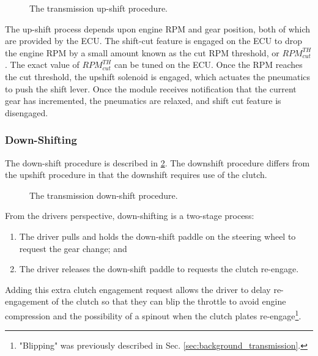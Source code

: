 \begin{figure}[H]
	\centering
	
	\caption{The transmission up-shift procedure.}
	\label{fig:transmission_upshift_flow}
\end{figure}

The up-shift process depends upon engine RPM and gear position, both of which are provided by the ECU. The shift-cut feature is engaged on the ECU to drop the engine RPM by a small amount known as the cut RPM threshold, or $RPM^{TH}_{cut}$. The exact value of $RPM^{TH}_{cut}$ can be tuned on the ECU. Once the RPM reaches the cut threshold, the upshift solenoid is engaged, which actuates the pneumatics to push the shift lever. Once the module receives notification that the current gear has incremented, the pneumatics are relaxed, and shift cut feature is disengaged.


\subsubsection{Down-Shifting}

The down-shift procedure is described in \ref{fig:transmission_downshift_flow}. The downshift procedure differs from the upshift procedure in that the downshift requires use of the clutch. 

\begin{figure}[H]
	\centering
	
	\caption{The transmission down-shift procedure.}
	\label{fig:transmission_downshift_flow}
\end{figure}

From the drivers perspective, down-shifting is a two-stage process:

\begin{enumerate}
  \item The driver pulls and holds the down-shift paddle on the steering wheel to request the gear change; and
  \item The driver releases the down-shift paddle to requests the clutch re-engage.
\end{enumerate}

Adding this extra clutch engagement request allows the driver to delay re-engagement of the clutch so that they can blip the throttle to avoid engine compression and the possibility of a spinout when the clutch plates re-engage\footnote{"Blipping" was previously described in Sec. \ref{sec:background_transmission}.}. 

